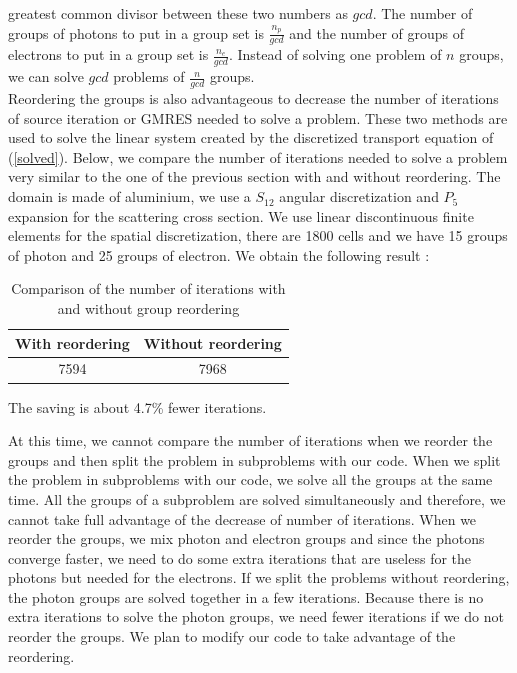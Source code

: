 greatest common divisor between these two numbers as $gcd$. The number of 
groups of photons to put in a group set is $\frac{n_p}{gcd}$ and the number 
of groups of electrons to put in a group set is $\frac{n_e}{gcd}$. Instead 
of solving one problem of $n$ groups, we can solve $gcd$ problems of 
$\frac{n}{gcd}$ groups.\\
Reordering the groups is also advantageous to decrease the number of
iterations of source iteration or GMRES needed to solve a problem. These two
methods are used to solve the linear system created by the discretized
transport equation of (\ref{solved}).
Below, we compare the number of iterations needed to
solve a problem very similar to the one of the previous section with and
without reordering. The domain is
made of aluminium, we use a $S_{12}$ angular discretization and $P_5$ expansion
for the scattering cross section. We use linear discontinuous finite elements 
for the spatial discretization, there are 1800 cells and we have 15 groups 
of photon and 25 groups of electron. We obtain the following result :
\begin{table}[H]
\begin{center}
\caption{Comparison of the number of iterations with and without group reordering}
\begin{tabular}{|c|c|}
\hline
With reordering & Without reordering\\
\hline
7594 & 7968\\
\hline
\end{tabular}
\end{center}
\end{table}
The saving is about 4.7\% fewer iterations.

At this time, we cannot compare the number of iterations when we reorder the
groups and then split the problem in
subproblems with our code. When we split the problem in subproblems with our
code, we
solve all the groups at the same time. All the groups of a subproblem are
solved simultaneously and therefore, we cannot take full advantage of the
decrease of number of iterations. When we reorder the groups, we mix photon and
electron groups and since the photons converge faster, we need to do some
extra iterations that are useless for the photons but needed for the
electrons. If we split the problems without reordering, the photon groups are
solved together in a few iterations. Because there is no extra iterations to
solve the photon groups, we need fewer iterations if we do not reorder the
groups. We plan to modify our code to take advantage of the reordering.
